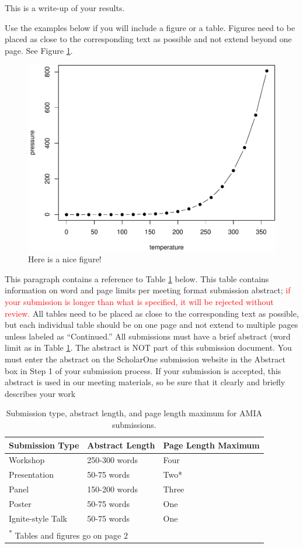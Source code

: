 \documentclass[
]{article}
\begin{document}
This is a write-up of your results.

Use the examples below if you will include a figure or a table. Figures need to be placed as close to the corresponding text as possible and not extend beyond one page. See Figure \ref{fig:nice-fig}.

\begin{figure}

{\centering \includegraphics[width=0.5\linewidth]{testmanuscript_files/figure-latex/nice-fig-1} 

}

\caption{Here is a nice figure!}\label{fig:nice-fig}
\end{figure}

This paragraph contains a reference to Table \ref{tab:nice-tab} below. This table contains information on word and page limits per meeting format submission abstract; \textcolor{red}{if your submission is longer than what is specified, it will be rejected without review.} All tables need to be placed as close to the corresponding text as possible, but each individual table should be on one page and not extend to multiple pages unless labeled as ``Continued.'' All submissions must have a brief abstract (word limit as in Table \ref{tab:nice-tab}. The abstract is NOT part of this submission document. You must enter the abstract on the ScholarOne submission website in the Abstract box in Step 1 of your submission process. If your submission is accepted, this abstract is used in our meeting materials, so be sure that it clearly and briefly describes your work

\begin{table}

\caption{\label{tab:nice-tab}Submission type, abstract length, and page length maximum for AMIA submissions.}
\centering
\begin{tabular}[t]{lll}
\toprule
Submission Type & Abstract Length & Page Length Maximum\\
\midrule
Workshop & 250-300 words & Four\\
Presentation & 50-75 words & Two*\\
Panel & 150-200 words & Three\\
Poster & 50-75 words & One\\
Ignite-style Talk & 50-75 words & One\\
\bottomrule
\multicolumn{3}{l}{\rule{0pt}{1em}\textsuperscript{*} Tables and figures go on page 2}\\
\end{tabular}
\end{table}
\end{document}
